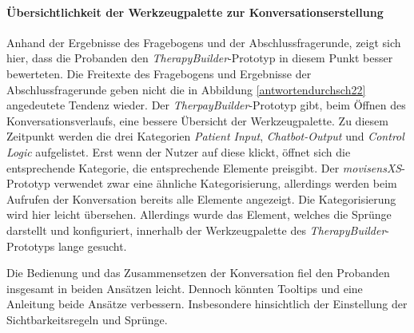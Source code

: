 \paragraph{Übersichtlichkeit der Werkzeugpalette zur Konversationserstellung}
Anhand der Ergebnisse des Fragebogens und der Abschlussfragerunde, zeigt sich hier, dass die Probanden den \emph{TherapyBuilder}-Prototyp in diesem Punkt besser bewerteten. Die Freitexte des Fragebogens und Ergebnisse der Abschlussfragerunde geben nicht die in Abbildung \ref{antwortendurchsch22} angedeutete Tendenz wieder. Der \emph{TherpayBuilder}-Prototyp gibt, beim  Öffnen des Konversationsverlaufs, eine bessere Übersicht der Werkzeugpalette. Zu diesem Zeitpunkt werden die drei Kategorien \emph{Patient Input}, \emph{Chatbot-Output} und \emph{Control Logic} aufgelistet. Erst wenn der Nutzer auf diese klickt, öffnet sich die entsprechende Kategorie, die entsprechende Elemente preisgibt. Der \emph{movisensXS}-Prototyp verwendet zwar eine ähnliche Kategorisierung, allerdings werden beim Aufrufen der Konversation bereits alle Elemente angezeigt. Die Kategorisierung wird hier leicht übersehen. Allerdings wurde das Element, welches die Sprünge darstellt und konfiguriert, innerhalb der Werkzeugpalette des \emph{TherapyBuilder}-Prototyps lange gesucht. 

Die Bedienung und das Zusammensetzen der Konversation fiel den Probanden insgesamt in beiden Ansätzen leicht. Dennoch könnten Tooltips und eine Anleitung beide Ansätze verbessern. Insbesondere hinsichtlich der Einstellung der Sichtbarkeitsregeln und Sprünge. 


